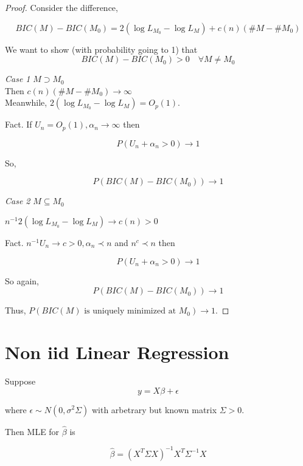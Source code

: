 \documentclass[11pt,fleqn]{book} %
\begin{document}
	 \begin{proof}
	 	Consider the difference, 

	 $$	BIC(M)-BIC(M_0) = 2(\log L_{M_0} - \log L_M) + c(n)(\#M - \#M_0)$$

	 We want to show (with probability going to 1) that 
	 	$$BIC(M) - BIC(M_0) >0 \quad \forall M \neq M_0 $$

	 	\textit{Case 1} $M \supset M_0$\\
	 	Then $c(n)(\#M - \#M_0) \rightarrow \infty$\\

	 	Meanwhile, $2(\log L_{M_0} - \log L_M) = O_p (1)$.\\

	 	\begin{remark}
	 		Fact. If $U_n = O_p(1), \alpha_n \rightarrow \infty$ then

	 		$$P(U_n + \alpha_n >0) \rightarrow 1 $$
	 	\end{remark}

	 	So, 

	 		$$P(BIC(M) - BIC(M_0))\rightarrow 1$$

	 \textit{Case 2} $M \subseteq M_0$

	 $n^{-1} 2(\log L_{M_0} - \log L_M) \rightarrow c(n)>0$

	 \begin{remark}
	 	Fact. $n^{-1}U_n \rightarrow c >0, \alpha_n \prec n $ and $n^c \prec n$ then

	 	$$P(U_n + \alpha_n > 0) \rightarrow 1 $$
	 \end{remark}

	 So again, 
	 	$$P(BIC(M) - BIC(M_0))\rightarrow 1 $$

	 	Thus, $P(BIC(M)\text{ is uniquely minimized at }M_0) \rightarrow 1$.

	 \end{proof}

\section{Non iid Linear Regression}

Suppose 
$$ y = X\beta + \epsilon $$

where $\epsilon \sim N(0, \sigma^2 \Sigma)$ with arbetrary but known matrix $\Sigma > 0$.

Then MLE for $\hat{\beta}$ is

$$\hat{\beta} = (X^T \Sigma X)^{-1}X^T \Sigma^{-1} X $$
\end{document}
